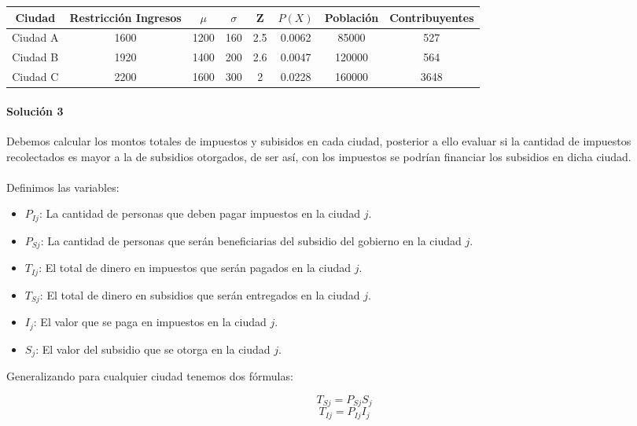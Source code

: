 \documentclass{article}
\begin{document}
\begin{center}
	\begin{tabular}{ | c | c | c | c | c | c | c | c | }
		\hline
		\textbf{Ciudad} & \textbf{Restricción Ingresos} & \textbf{$\mu$} & \textbf{$\sigma$} & \textbf{Z} & \textbf{$P(X)$} & \textbf{Población} & \textbf{Contribuyentes}\\
		\hline
		Ciudad A & 1600 & 1200 & 160 & 2.5 & 0.0062 & 85000 & 527 \\
		\hline
		Ciudad B & 1920 & 1400 & 200 & 2.6 & 0.0047 & 120000 & 564 \\
		\hline
		Ciudad C & 2200 & 1600 & 300 & 2 & 0.0228 & 160000 & 3648 \\
		\hline
	\end{tabular}
\end{center}

\paragraph{Solución 3} Debemos calcular los montos totales de impuestos y subisidos en cada ciudad, posterior a ello evaluar si la cantidad de impuestos recolectados es mayor a la de subsidios otorgados, de ser así, con los impuestos se podrían financiar los subsidios en dicha ciudad.

\paragraph{} Definimos las variables:

\begin{itemize}
	\item $P_{Ij}$: La cantidad de personas que deben pagar impuestos en la ciudad $j$.
	\item $P_{Sj}$: La cantidad de personas que serán beneficiarias del subsidio del gobierno en la ciudad $j$.
	\item $T_{Ij}$: El total de dinero en impuestos que serán pagados en la ciudad $j$.
	\item $T_{Sj}$: El total de dinero en subsidios que serán entregados en la ciudad $j$.
	\item $I_j$: El valor que se paga en impuestos en la ciudad $j$.
	\item $S_j$: El valor del subsidio que se otorga en la ciudad $j$.
\end{itemize}

Generalizando para cualquier ciudad tenemos dos fórmulas:

$$T_{Sj} = P_{Sj}S_j$$
$$T_{Ij} = P_{Ij}I_j$$
\end{document}
